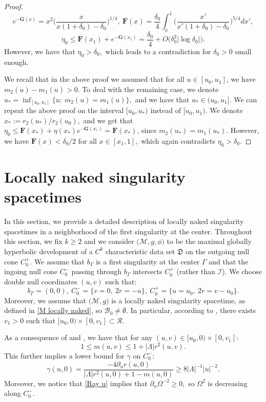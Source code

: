 \documentclass[11pt]{article}
\numberwithin{equation}{section}
\begin{document}
\begin{proof}
    \[e^{-\mathbf{G}(x)}=x^2\bigg(\frac{x}{x(1+\delta_0)-\delta_0}\bigg)^{1/4},\ \mathbf{F}(x)=\frac{\delta_0}{4}\int_x^1\bigg(\frac{x'}{x'(1+\delta_0)-\delta_0}\bigg)^{5/4}dx',\]
    \[\eta_0\leq\mathbf{F}(x_1)+e^{-\mathbf{G}(x_1)}=\frac{\delta_0}{4}+O\big(\delta_0^2|\log\delta_0|\big).\]
    However, we have that $\eta_0>\delta_0,$ which leads to a contradiction for $\delta_0>0$ small enough.

    We recall that in the above proof we assumed that for all $u\in[u_0,u_1]$, we have $m_2(u)-m_1(u)>0$. To deal with the remaining case, we denote $u_*=\inf_{[u_0,u_1]}\{u:\ m_2(u)=m_1(u)\},$ and we have that $u_*\in(u_0,u_1].$ We can repeat the above proof on the interval $[u_0,u_*)$ instead of $[u_0,u_1).$ We denote $x_*:=r_2(u_*)/r_{2}(u_0),$ and we get that $\eta_0\leq\mathbf{F}(x_*)+\eta(x_*)e^{-\mathbf{G}(x_*)}=\mathbf{F}(x_*)$, since $m_2(u_*)=m_1(u_*)$. However, we have $\mathbf{F}(x)<\delta_0/2$ for all $x\in[x_1,1],$ which again contradicts $\eta_0>\delta_0.$
\end{proof}



\section{Locally naked singularity spacetimes}\label{naked singularity section}
In this section, we provide a detailed description of locally naked singularity spacetimes in a neighborhood of the first singularity at the center. Throughout this section, we fix $k\geq 2$ and we consider $\big(\mathcal{M},g,\phi\big)$ to be the maximal globally hyperbolic development of a $C^k$ characteristic data set $\mathfrak{D}$ on the outgoing null cone $C_0^+.$ We assume that $b_{\Gamma}$ is a first singularity at the center $\Gamma$ and that the ingoing null cone $C_0^-$ passing through $b_{\Gamma}$ intersects $C_0^+$ (rather than $\mathcal{I}$). We choose double null coordinates $(u,v)$ such that: \[b_{\Gamma}=(0,0),\ C_0^-=\big\{v=0,\ 2r=-u\big\},\ C_0^+=\big\{u=u_0,\ 2r=v-u_0\big\}.\]
Moreover, we assume that $\big(\mathcal{M},g\big)$ is a locally naked singularity spacetime, as defined in \eqref{M locally naked}, so $\mathcal{B}_0\neq\emptyset.$ In particular, according to , there exists $v_1>0$ such that $[u_0,0)\times[0,v_1]\subset\mathcal{R}$.

As a consequence of  and , we have that for any $(u,v)\in[u_0,0)\times[0,v_1]:$
\begin{equation}\label{bounds for mass locally naked}
    1\leq m(u,v)\leq1+|\Lambda|r^2(u,v).
\end{equation}
This further implies a lower bound for $\gamma$ on $C_0^-$:
\begin{equation}\label{gamma lower bound on C0-}
    \gamma(u,0)=\frac{-4\partial_ur(u,0)}{|\Lambda|r^2(u,0)+1-m(u,0)}\geq8|\Lambda|^{-1}|u|^{-2}.
\end{equation}
Moreover, we notice that \eqref{Ray u} implies that $\partial_u\Omega^{-2}\geq0,$ so $\Omega^2$ is decreasing along $C_0^-$. 
\end{document}
